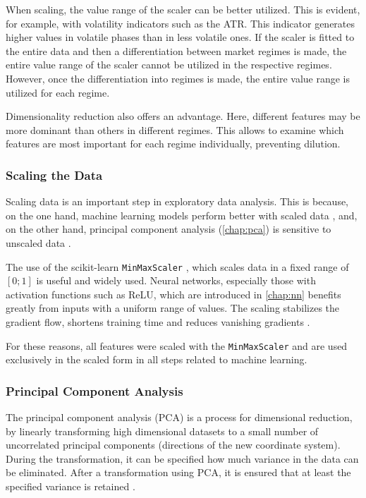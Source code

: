 When scaling, the value range of the scaler can be better utilized.
This is evident, for example, with volatility indicators such as the ATR.
This indicator generates higher values in volatile phases than in less volatile ones.
If the scaler is fitted to the entire data and then a differentiation between market regimes is made, the entire value range of the scaler cannot be utilized in the respective regimes.
However, once the differentiation into regimes is made, the entire value range is utilized for each regime.

Dimensionality reduction also offers an advantage.
Here, different features may be more dominant than others in different regimes.
This allows to examine which features are most important for each regime individually, preventing dilution.

\subsubsection{Scaling the Data}

Scaling data is an important step in exploratory data analysis.
This is because, on the one hand, machine learning models perform better with scaled data \cite{data-scaling}, and, on the other hand, principal component analysis (\autoref{chap:pca}) is sensitive to unscaled data \cite{pca-scaling}.

The use of the scikit-learn \texttt{MinMaxScaler} \cite{min-max}, which scales data in a fixed range of $[0; 1]$ is useful and widely used.
Neural networks, especially those with activation functions such as ReLU, which are introduced in \autoref{chap:nn} benefits greatly from inputs with a uniform range of values.
The scaling stabilizes the gradient flow, shortens training time and reduces vanishing gradients \cite{min-max-benefits}.

For these reasons, all features were scaled with the \texttt{MinMaxScaler} and are used exclusively in the scaled form in all steps related to machine learning.

\subsubsection{Principal Component Analysis}
\label{chap:pca}

The principal component analysis (PCA) is a process for dimensional reduction, by linearly transforming high dimensional datasets to a small number of uncorrelated principal components  (directions of the new coordinate system).
During the transformation, it can be specified how much variance in the data can be eliminated.
After a transformation using PCA, it is ensured that at least the specified variance is retained \cite{wikipedia-pca}.


